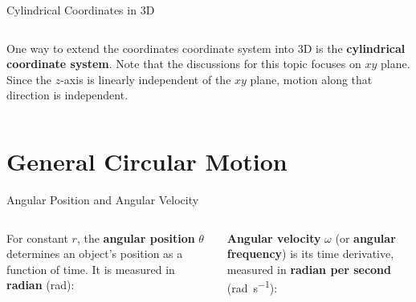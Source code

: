 \documentclass[12pt,compress,aspectratio=169]{beamer}
\begin{document}
\begin{frame}{Cylindrical Coordinates in 3D}
  \begin{columns}

    One way to extend the coordinates coordinate system into 3D is the
    \textbf{cylindrical coordinate system}. Note that the discussions for this
    topic focuses on $xy$ plane. Since the $z$-axis is linearly independent of
    the $xy$ plane, motion along that direction is independent.
  \end{columns}
\end{frame}



\section{General Circular Motion}

\begin{frame}{Angular Position and Angular Velocity}
  \vspace{.2in}
  \begin{columns}[T]
    
    For constant $r$, the \textbf{angular position} $\theta$ determines an
    object's position as a function of time. It is measured in
    \textbf{radian} (\si{\radian}):

    
    \vspace{-.1in}\textbf{Angular velocity} $\omega$ (or \textbf{angular
      frequency}) is its time derivative, measured in \textbf{radian per second}
    (\si{\radian\per\second}):
      
  \end{columns}
\end{frame}
\end{document}
